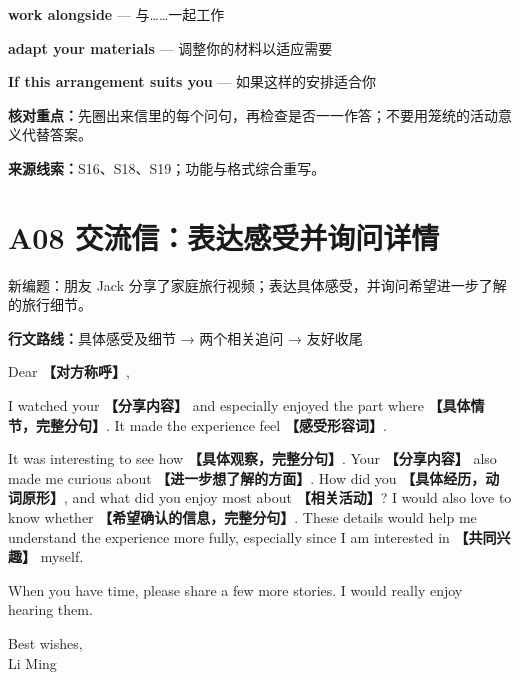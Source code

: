 \documentclass[11pt,a4paper,fontset=macnew]{ctexart}
\newenvironment{writing}{\begingroup\fontsize{10.5}{13.5}\selectfont\setlength{\parskip}{3pt}}{\par\endgroup}
\begin{document}
{\small\textbf{work alongside} — 与……一起工作}\par
{\small\textbf{adapt your materials} — 调整你的材料以适应需要}\par
{\small\textbf{If this arrangement suits you} — 如果这样的安排适合你}\par
{\small\textbf{核对重点：}先圈出来信里的每个问句，再检查是否一一作答；不要用笼统的活动意义代替答案。}\par
{\fontsize{8}{10}\selectfont\textbf{来源线索：}S16、S18、S19；功能与格式综合重写。}\par
\clearpage\section*{A08  交流信：表达感受并询问详情}
{\small 新编题：朋友 Jack 分享了家庭旅行视频；表达具体感受，并询问希望进一步了解的旅行细节。}\par
{\small\textbf{行文路线：}具体感受及细节 → 两个相关追问 → 友好收尾}\par
\par\vspace{4pt}{\bfseries 可替换模板}\par\nopagebreak
\begin{writing}
\noindent Dear {\bfseries 【对方称呼】},\par
I watched your {\bfseries 【分享内容】} and especially enjoyed the part where {\bfseries 【具体情节，完整分句】}. It made the experience feel {\bfseries 【感受形容词】}.

It was interesting to see how {\bfseries 【具体观察，完整分句】}. Your {\bfseries 【分享内容】} also made me curious about {\bfseries 【进一步想了解的方面】}. How did you {\bfseries 【具体经历，动词原形】}, and what did you enjoy most about {\bfseries 【相关活动】}? I would also love to know whether {\bfseries 【希望确认的信息，完整分句】}. These details would help me understand the experience more fully, especially since I am interested in {\bfseries 【共同兴趣】} myself.

When you have time, please share a few more stories. I would really enjoy hearing them.

\noindent Best wishes,\\Li Ming\par
\end{writing}
\par\vspace{4pt}{\bfseries 完整套用示例}\par\nopagebreak
\end{document}
